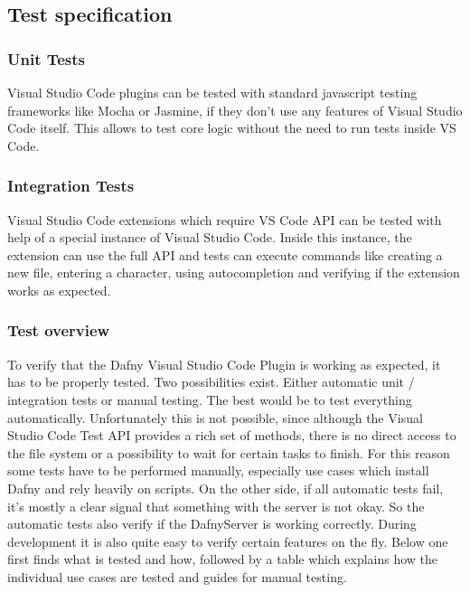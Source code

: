 \subsection{Test specification}

\subsubsection{Unit Tests}
Visual Studio Code plugins can be tested with standard javascript testing frameworks like Mocha or Jasmine, if they don't use any features of Visual Studio Code itself. This allows to test core logic without the need to run tests inside VS Code.

\subsubsection{Integration Tests}
Visual Studio Code extensions which require VS Code API can be tested with help of a special instance of Visual Studio Code. Inside this instance, the extension can use the full API and tests can execute commands like creating a new file, entering a character, using autocompletion and verifying if the extension works as expected.   

\subsubsection{Test overview}
To verify that the Dafny Visual Studio Code Plugin is working as expected, it has to be properly tested. Two possibilities exist. Either automatic unit / integration tests or manual testing. The best would be to test everything automatically. Unfortunately this is not possible, since although the Visual Studio Code Test API provides a rich set of methods, there is no direct access to the file system or a possibility to wait for certain tasks to finish. For this reason some tests have to be performed manually, especially use cases which install Dafny and rely heavily on scripts. On the other side, if all automatic tests fail, it's mostly a clear signal that something with the server is not okay. So the automatic tests also verify if the DafnyServer is working correctly. During development it is also quite easy to verify certain features on the fly. 
Below one first finds what is tested and how, followed by a table which explains how the individual use cases are tested and guides for manual testing. 

